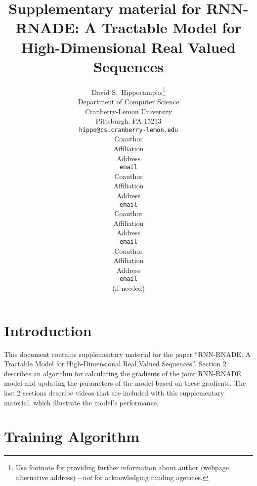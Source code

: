 \documentclass{article} %
\title{Supplementary material for RNN-RNADE: A Tractable Model for High-Dimensional Real Valued Sequences}
\author{
David S.~Hippocampus\thanks{ Use footnote for providing further information
about author (webpage, alternative address)---\emph{not} for acknowledging
funding agencies.} \\
Department of Computer Science\\
Cranberry-Lemon University\\
Pittsburgh, PA 15213 \\
\texttt{hippo@cs.cranberry-lemon.edu} \\
\And
Coauthor \\
Affiliation \\
Address \\
\texttt{email} \\
\AND
Coauthor \\
Affiliation \\
Address \\
\texttt{email} \\
\And
Coauthor \\
Affiliation \\
Address \\
\texttt{email} \\
\And
Coauthor \\
Affiliation \\
Address \\
\texttt{email} \\
(if needed)\\
}
\begin{document}
\maketitle


\section{Introduction}

This document contains supplementary material for the paper ``RNN-RNADE: A Tractable Model for High-Dimensional Real Valued Sequences''. Section 2 describes an algorithm for calculating the gradients of the joint RNN-RNADE model and updating the parameters of the model based on these gradients. The last 2 sections describe videos that are included with this supplementary material, which illustrate the model's performance. 

\section{Training Algorithm}
\end{document}

